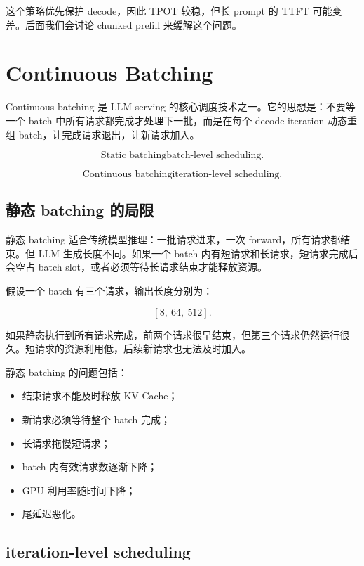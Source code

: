 这个策略优先保护 decode，因此 TPOT 较稳，但长 prompt 的 TTFT 可能变差。后面我们会讨论 chunked prefill 来缓解这个问题。

\section{Continuous Batching}
\label{sec:continuous-batching}

Continuous batching 是 LLM serving 的核心调度技术之一。它的思想是：不要等一个 batch 中所有请求都完成才处理下一批，而是在每个 decode iteration 动态重组 batch，让完成请求退出，让新请求加入。

\[
\text{Static batching}
\text{batch-level scheduling}.
\]

\[
\text{Continuous batching}
\text{iteration-level scheduling}.
\]

\subsection{静态 batching 的局限}
\label{subsec:static-batching-limitations}

静态 batching 适合传统模型推理：一批请求进来，一次 forward，所有请求都结束。但 LLM 生成长度不同。如果一个 batch 内有短请求和长请求，短请求完成后会空占 batch slot，或者必须等待长请求结束才能释放资源。

假设一个 batch 有三个请求，输出长度分别为：

\[
[8,\ 64,\ 512].
\]

如果静态执行到所有请求完成，前两个请求很早结束，但第三个请求仍然运行很久。短请求的资源利用低，后续新请求也无法及时加入。

静态 batching 的问题包括：

\begin{itemize}
\item 结束请求不能及时释放 KV Cache；
\item 新请求必须等待整个 batch 完成；
\item 长请求拖慢短请求；
\item batch 内有效请求数逐渐下降；
\item GPU 利用率随时间下降；
\item 尾延迟恶化。
\end{itemize}

\subsection{iteration-level scheduling}
\label{subsec:iteration-level-scheduling}

